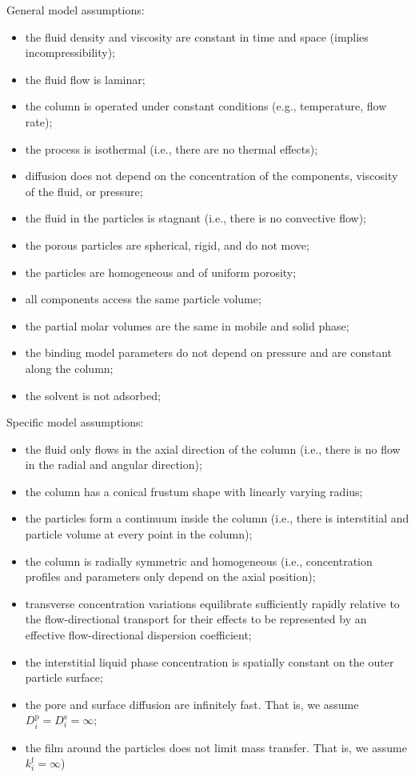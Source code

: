 \documentclass{article}
\begin{document}
General model assumptions:
\begin{itemize}
    \item the fluid density and viscosity are constant in time and space (implies incompressibility);
    \item the fluid flow is laminar;
    \item the column is operated under constant conditions (e.g., temperature, flow rate);
    \item the process is isothermal (i.e., there are no thermal effects);
    \item diffusion does not depend on the concentration of the components, viscosity of the fluid, or pressure;
    \item the fluid in the particles is stagnant (i.e., there is no convective flow);
    \item the porous particles are spherical, rigid, and do not move;
    \item the particles are homogeneous and of uniform porosity;
    \item all components access the same particle volume;
    \item the partial molar volumes are the same in mobile and solid phase;
    \item the binding model parameters do not depend on pressure and are constant along the column;
    \item the solvent is not adsorbed;
\end{itemize}

Specific model assumptions:
\begin{itemize}
    \item the fluid only flows in the axial direction of the column (i.e., there is no flow in the radial and angular direction);
    \item the column has a conical frustum shape with linearly varying radius;
    \item the particles form a continuum inside the column (i.e., there is interstitial and particle volume at every point in the column);
    \item the column is radially symmetric and homogeneous (i.e., concentration profiles and parameters only depend on the axial position);
    \item transverse concentration variations equilibrate sufficiently rapidly relative to the flow-directional transport for their effects to be represented by an effective flow-directional dispersion coefficient;
    \item the interstitial liquid phase concentration is spatially constant on the outer particle surface;
    \item the pore and surface diffusion are infinitely fast. That is, we assume $D^{\mathrm{p}}_{i} = D^{\mathrm{s}}_{i} = \infty$;
    \item the film around the particles does not limit mass transfer. That is, we assume $k^{\mathrm{f}}_{i} = \infty$)
\end{itemize}
\end{document}
